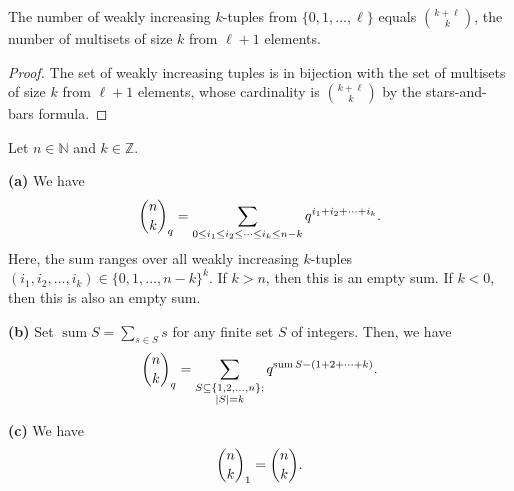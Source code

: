 \begin{lemma}
\label{lem.pars.qbinom.monotone-count-choose}
\leanhelper
\leanok
The number of weakly increasing $k$-tuples from $\{0, 1, \ldots, \ell\}$
equals $\binom{k+\ell}{k}$, the number of multisets of size $k$
from $\ell + 1$ elements.
\end{lemma}

\begin{proof}
\leanok
The set of weakly increasing tuples is in bijection with the set of
multisets of size $k$ from $\ell + 1$ elements,
whose cardinality is $\binom{k+\ell}{k}$ by the stars-and-bars formula.
\end{proof}

\begin{proposition}
\label{prop.pars.qbinom.alt-defs}
\leantarget
\leanok
Let $n\in\mathbb{N}$ and $k\in\mathbb{Z}$.

\textbf{(a)} We have
\[
\dbinom{n}{k}_{q}=\sum_{0\leq i_{1}\leq i_{2}\leq\cdots\leq i_{k}\leq
n-k}q^{i_{1}+i_{2}+\cdots+i_{k}}.
\]
Here, the sum ranges over all weakly increasing $k$-tuples $(i_{1},i_{2},\ldots,i_{k})
\in\{0,1,\ldots,n-k\}^{k}$. If $k>n$, then this is an empty sum.
If $k<0$, then this is also an empty sum.

\textbf{(b)} Set $\operatorname{sum}S=\sum_{s\in S}s$ for any finite set $S$
of integers. Then, we have
\[
\dbinom{n}{k}_{q}=\sum_{\substack{S\subseteq\{1,2,\ldots,n\}
;\\\left|S\right|=k}}q^{\operatorname{sum}S-(1+2+\cdots+k)}.
\]

\textbf{(c)} We have
\[
\dbinom{n}{k}_{1}=\dbinom{n}{k}.
\]
\end{proposition}

